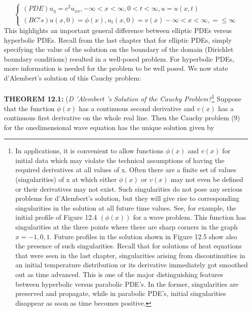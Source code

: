 \documentclass[../main.tex]{subfiles}
\begin{document}
\begin{equation}
\left\{\begin{array}{ll}
(PDE) u_\eta=c^2u_{xx}, -\infty<x<\infty, 0<t<\infty, u=u(x,t)\\
(BC's) u(x,0)=\phi(x), u_t(x,0)=v(x)-\infty<x<\infty ,=\leqslant \infty
\end{array} \right.
\label{eq:eps}
\end{equation}
This highlights an important general difference between elliptic PDEs versus
hyperbolic PDEs. Recall from the last chapter that for elliptic PDEs, simply
specifying the value of the solution on the boundary of the domain (Dirichlet
boundary conditions) resulted in a well-posed problem. For hyperbolic PDEs,
more information is needed for the problem to be well posed. We now state
d'Alembert's solution of this Cauchy problem: 
\\
\\
\textbf{THEOREM 12.1:}
(\emph{D 'Alembert 's Solution of the Cauchy Problem?}\footnote
{ In applications, it is convenient to allow functions $\phi(x)$ and $v(x)$ for initial data which may violate
the technical assumptions of having the required derivatives at all values of x. Often there are a finite
set of values (singularities) of x at which either $\phi(x)$ or $v(x)$ may not even be defined or their
derivatives may not exist. Such singularities do not pose any serious problems for d'Alembert's
solution, but they will give rise to corresponding singularities in the solution at all future time values.
See, for example, the initial profile of Figure 12.4 $(\phi(x))$ for a wave problem.  This function has
singularities at the three points where there are sharp corners in the graph $x = -1 , 0, 1$. Future profiles
in the solution shown in Figure 12.5 show also the presence of such singularities. Recall that for
solutions of heat equations that were seen in the last chapter, singularities arising from discontinuities
in an initial temperature distribution or its derivative immediately got smoothed out as time advanced.
This is one of the major distinguishing features between hyperbolic versus parabolic PDE's. In the
former, singularities are preserved and propagate, while in parabolic PDE's, initial singularities
disappear as soon as time becomes positive.} 
Suppose that
the function $\phi(x)$ has a continuous second derivative and $v(x)$ has a continuous
first derivative on the whole real line. Then the Cauchy problem (9) for the onedimensional wave equation has the unique solution given by 
\end{document}
